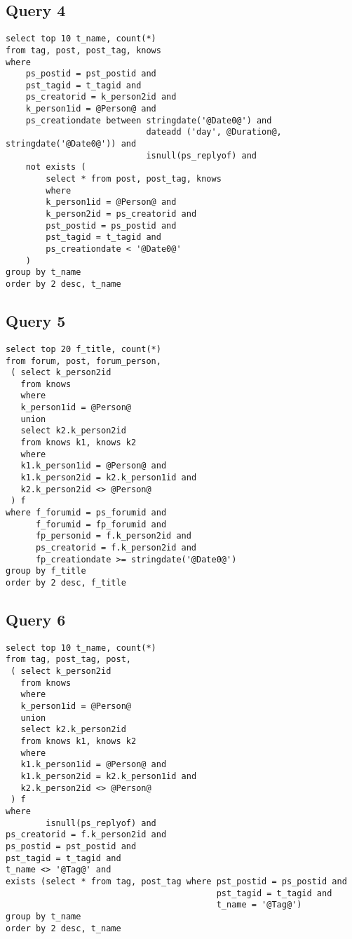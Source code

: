 \subsection{Query 4}
{\footnotesize
\begin{verbatim}
select top 10 t_name, count(*)
from tag, post, post_tag, knows
where
    ps_postid = pst_postid and
    pst_tagid = t_tagid and
    ps_creatorid = k_person2id and
    k_person1id = @Person@ and
    ps_creationdate between stringdate('@Date0@') and 
                            dateadd ('day', @Duration@, stringdate('@Date0@')) and
                            isnull(ps_replyof) and
    not exists (
        select * from post, post_tag, knows
        where
        k_person1id = @Person@ and
        k_person2id = ps_creatorid and
        pst_postid = ps_postid and
        pst_tagid = t_tagid and
        ps_creationdate < '@Date0@'
    )
group by t_name
order by 2 desc, t_name
\end{verbatim}
}


\subsection{Query 5}
{\footnotesize
\begin{verbatim}
select top 20 f_title, count(*)
from forum, post, forum_person,
 ( select k_person2id
   from knows
   where
   k_person1id = @Person@
   union
   select k2.k_person2id
   from knows k1, knows k2
   where
   k1.k_person1id = @Person@ and 
   k1.k_person2id = k2.k_person1id and
   k2.k_person2id <> @Person@
 ) f
where f_forumid = ps_forumid and 
      f_forumid = fp_forumid and 
      fp_personid = f.k_person2id and 
      ps_creatorid = f.k_person2id and
      fp_creationdate >= stringdate('@Date0@')
group by f_title
order by 2 desc, f_title
\end{verbatim}
}

\subsection{Query 6}
{\footnotesize
\begin{verbatim}
select top 10 t_name, count(*)
from tag, post_tag, post,
 ( select k_person2id
   from knows
   where
   k_person1id = @Person@
   union
   select k2.k_person2id
   from knows k1, knows k2
   where
   k1.k_person1id = @Person@ and 
   k1.k_person2id = k2.k_person1id and 
   k2.k_person2id <> @Person@
 ) f
where
        isnull(ps_replyof) and
ps_creatorid = f.k_person2id and
ps_postid = pst_postid and
pst_tagid = t_tagid and
t_name <> '@Tag@' and
exists (select * from tag, post_tag where pst_postid = ps_postid and 
                                          pst_tagid = t_tagid and 
                                          t_name = '@Tag@')
group by t_name
order by 2 desc, t_name
\end{verbatim}
}


